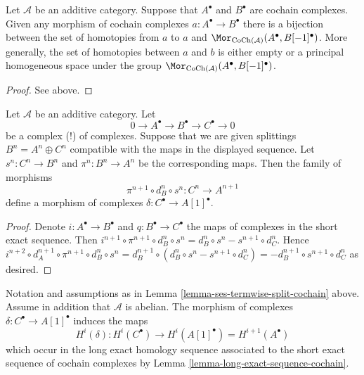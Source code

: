 \begin{lemma}
\label{lemma-homotopy-shift-cochain}
Let $\mathcal{A}$ be an additive category.
Suppose that $A^\bullet$ and $B^\bullet$ are
cochain complexes. Given any morphism of cochain
complexes $a : A^\bullet \to B^\bullet$ there
is a bijection between the set of homotopies
from $a$ to $a$ and
$\Mor_{\text{CoCh}(\mathcal{A})}(A^\bullet, B[-1]^\bullet)$.
More generally, the set of homotopies between
$a$ and $b$ is either empty or a principal homogeneous
space under the group
$\Mor_{\text{CoCh}(\mathcal{A})}(A^\bullet, B[-1]^\bullet)$.
\end{lemma}

\begin{proof}
See above.
\end{proof}

\begin{lemma}
\label{lemma-ses-termwise-split-cochain}
Let $\mathcal{A}$ be an additive category.
Let
$$
0 \to A^\bullet \to B^\bullet \to C^\bullet \to 0
$$
be a complex (!) of complexes.
Suppose that we are given splittings $B^n = A^n \oplus C^n$
compatible with the maps in the displayed sequence.
Let $s^n : C^n \to B^n$ and $\pi^n : B^n \to A^n$ be the
corresponding maps. Then the family of morphisms
$$
\pi^{n + 1} \circ d_B^n \circ s^n
:
C^n \to A^{n + 1}
$$
define a morphism of complexes $\delta : C^\bullet \to A[1]^\bullet$.
\end{lemma}

\begin{proof}
Denote $i : A^\bullet \to B^\bullet$ and $q : B^\bullet \to C^\bullet$
the maps of complexes in the short exact sequence. Then
$i^{n + 1} \circ \pi^{n + 1} \circ d_B^n \circ s^n =
d_B^n \circ s^n - s^{n + 1} \circ d_C^n$. Hence
$i^{n + 2} \circ d_A^{n + 1} \circ \pi^{n + 1} \circ d_B^n \circ s^n =
d_B^{n + 1} \circ (d_B^n \circ s^n - s^{n + 1} \circ d_C^n) =
- d_B^{n + 1} \circ s^{n + 1} \circ d_C^n$ as desired.
\end{proof}

\begin{lemma}
\label{lemma-ses-termwise-split-long-cochain}
Notation and assumptions as in
Lemma \ref{lemma-ses-termwise-split-cochain} above.
Assume in addition that $\mathcal{A}$ is abelian.
The morphism of complexes $\delta : C^\bullet \to A[1]^\bullet$
induces the maps
$$
H^i(\delta) :
H^i(C^\bullet) \longrightarrow H^i(A[1]^\bullet) = H^{i + 1}(A^\bullet)
$$
which occur in the long exact homology sequence associated
to the short exact sequence of cochain complexes by
Lemma \ref{lemma-long-exact-sequence-cochain}.
\end{lemma}

